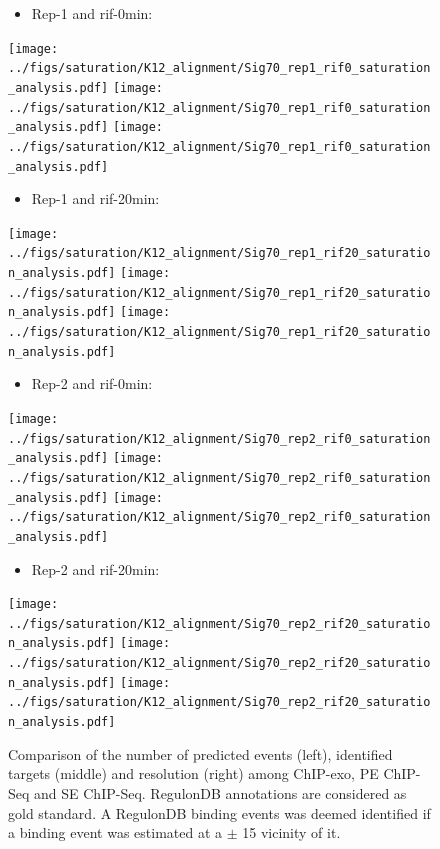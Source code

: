 \documentclass{bmcart}\usepackage[]{graphicx}\usepackage[]{color}
\begin{document}
\begin{figure}[h!] %
  \centering
  \begin{itemize}
  \item Rep-1 and rif-0min:
  \end{itemize}
  \texttt{[image: ../figs/saturation/K12\_alignment/Sig70\_rep1\_rif0\_saturation\_analysis.pdf]}
  \texttt{[image: ../figs/saturation/K12\_alignment/Sig70\_rep1\_rif0\_saturation\_analysis.pdf]}
  \texttt{[image: ../figs/saturation/K12\_alignment/Sig70\_rep1\_rif0\_saturation\_analysis.pdf]}

  \begin{itemize}
  \item Rep-1 and rif-20min:
  \end{itemize}

  \texttt{[image: ../figs/saturation/K12\_alignment/Sig70\_rep1\_rif20\_saturation\_analysis.pdf]}
  \texttt{[image: ../figs/saturation/K12\_alignment/Sig70\_rep1\_rif20\_saturation\_analysis.pdf]}
  \texttt{[image: ../figs/saturation/K12\_alignment/Sig70\_rep1\_rif20\_saturation\_analysis.pdf]}

  \begin{itemize}
  \item Rep-2 and rif-0min:
  \end{itemize}

  \texttt{[image: ../figs/saturation/K12\_alignment/Sig70\_rep2\_rif0\_saturation\_analysis.pdf]}
  \texttt{[image: ../figs/saturation/K12\_alignment/Sig70\_rep2\_rif0\_saturation\_analysis.pdf]}
  \texttt{[image: ../figs/saturation/K12\_alignment/Sig70\_rep2\_rif0\_saturation\_analysis.pdf]}

  \begin{itemize}
  \item Rep-2 and rif-20min:
  \end{itemize}

  \texttt{[image: ../figs/saturation/K12\_alignment/Sig70\_rep2\_rif20\_saturation\_analysis.pdf]}
  \texttt{[image: ../figs/saturation/K12\_alignment/Sig70\_rep2\_rif20\_saturation\_analysis.pdf]}
  \texttt{[image: ../figs/saturation/K12\_alignment/Sig70\_rep2\_rif20\_saturation\_analysis.pdf]}
  \caption{Comparison of the number of predicted events (left),
    identified targets (middle) and resolution (right) among ChIP-exo,
    PE ChIP-Seq and SE ChIP-Seq. RegulonDB annotations are considered
    as gold standard. A RegulonDB binding events was deemed identified
    if a binding event was estimated at a $\pm$ 15 vicinity
    of it.}
  \label{fig:saturation_rif}
\end{figure}
\end{document}
